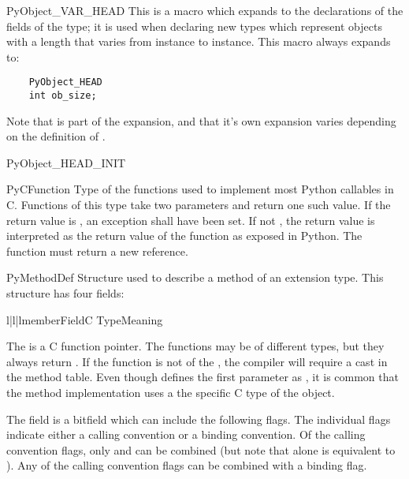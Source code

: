 \begin{csimplemacrodesc}{PyObject_VAR_HEAD}
  This is a macro which expands to the declarations of the fields of
  the  type; it is used when declaring new types which
  represent objects with a length that varies from instance to
  instance.  This macro always expands to:
  \begin{verbatim}
    PyObject_HEAD
    int ob_size;
  \end{verbatim}
  Note that  is part of the expansion, and
  that it's own expansion varies depending on the definition of
  .
\end{csimplemacrodesc}

PyObject_HEAD_INIT

\begin{ctypedesc}{PyCFunction}
  Type of the functions used to implement most Python callables in C.
  Functions of this type take two  parameters and
  return one such value.  If the return value is \NULL, an exception
  shall have been set.  If not \NULL, the return value is interpreted
  as the return value of the function as exposed in Python.  The
  function must return a new reference.
\end{ctypedesc}

\begin{ctypedesc}{PyMethodDef}
  Structure used to describe a method of an extension type.  This
  structure has four fields:

  \begin{tableiii}{l|l|l}{member}{Field}{C Type}{Meaning}
  \end{tableiii}
\end{ctypedesc}

The  is a C function pointer.  The functions may be of
different types, but they always return .  If the
function is not of the , the compiler will require
a cast in the method table.  Even though  defines
the first parameter as , it is common that the method
implementation uses a the specific C type of the  object.

The  field is a bitfield which can include the
following flags.  The individual flags indicate either a calling
convention or a binding convention.  Of the calling convention flags,
only  and  can be
combined (but note that  alone is equivalent
to ).
Any of the calling convention flags can be combined with a
binding flag.

